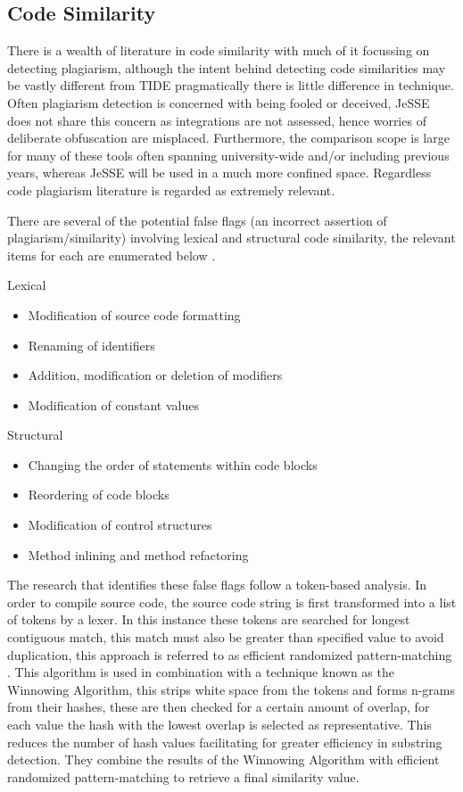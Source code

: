 \documentclass[jou,apacite]{apa6}
\begin{document}
\subsection{Code Similarity}
There is a wealth of literature in code similarity with much of it focussing on detecting plagiarism, although the intent behind detecting code similarities may be vastly different from TIDE pragmatically there is little difference in technique. Often plagiarism detection is concerned with being fooled or deceived, JeSSE does not share this concern as integrations are not assessed,  hence worries of deliberate obfuscation are misplaced. Furthermore, the comparison scope is large for many of these tools often spanning university-wide and/or including previous years, whereas JeSSE will be used in a much more confined space. Regardless code plagiarism literature is regarded as extremely relevant.

There are several of the potential false flags (an incorrect assertion of plagiarism/similarity) involving lexical and structural code similarity, the relevant items for each are enumerated below \cite{Duric2013}.

Lexical
\begin{itemize}
  \setlength\itemsep{-0.5em}
  \item Modification of source code formatting 
  \item Renaming of identifiers
  \item Addition, modification or deletion of modifiers
  \item Modification of constant values
\end{itemize}

Structural
\begin{itemize}
  \setlength\itemsep{-0.5em}
  \item Changing the order of statements within code blocks
  \item Reordering of code blocks
  \item Modification of control structures
  \item Method inlining and method refactoring
\end{itemize}

The research that identifies these false flags follow a token-based analysis. In order to compile source code, the source code string is first transformed into a list of tokens by a lexer. In this instance these tokens are searched for longest contiguous match, this match must also be greater than specified value to avoid duplication, this approach is referred to as efficient randomized pattern-matching \cite{Rabin1987}. This algorithm is used in combination with a technique known as the Winnowing Algorithm, this strips white space from the tokens and forms n-grams from their hashes, these are then checked for a certain amount of overlap, for each value the hash with the lowest overlap is selected as representative. This reduces the number of hash values facilitating for greater efficiency in substring detection. They combine the results of the Winnowing Algorithm with efficient randomized pattern-matching to retrieve a final similarity value.
\end{document}
